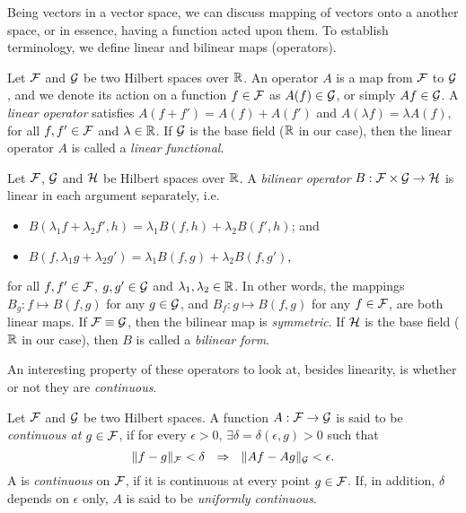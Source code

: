 Being vectors in a vector space, we can discuss mapping of vectors onto a another space, or in essence, having a function acted upon them.
To establish terminology, we define linear and bilinear maps (operators).

\begin{definition}
  Let ${\mathcal F}$ and ${\mathcal G}$ be two Hilbert spaces over $\mathbb{R}$.
  An operator $A$ is a map from ${\mathcal F}$ to ${\mathcal G}$, and we denote its action on a function $f \in{\mathcal F}$ as $A(f) \in {\mathcal G}$, or simply $Af \in {\mathcal G}$.
  A \emph{linear operator} satisfies $A(f+f') = A(f) + A(f')$ and $A(\lambda f) = \lambda A(f)$, for all $f,f' \in{\mathcal F}$ and $\lambda\in\mathbb{R}$.
  If ${\mathcal G}$ is the base field ($\mathbb{R}$ in our case), then the linear operator $A$ is called a \emph{linear functional}.
\end{definition}

\begin{definition}
  Let ${\mathcal F}$, ${\mathcal G}$ and ${\mathcal H}$ be Hilbert spaces over $\mathbb{R}$.
  A \emph{bilinear operator} $B:{\mathcal F}\times{\mathcal G}\to{\mathcal H}$ is linear in each argument separately, i.e.
  \begin{itemize}
    \item $B(\lambda_1 f +\lambda_2 f', h) = \lambda_1 B(f,h) + \lambda_2 B(f',h)$; and
    \item $B(f, \lambda_1 g +\lambda_2 g') = \lambda_1 B(f,g) + \lambda_2 B(f,g')$,
  \end{itemize} 
  for all $f,f' \in {\mathcal F}$, $g,g' \in {\mathcal G}$ and $\lambda_1,\lambda_2\in\mathbb{R}$.
  In other words, the mappings $B_g: f \mapsto B(f,g)$ for any $g\in{\mathcal G}$, and $B_f: g \mapsto B(f,g)$ for any $f\in{\mathcal F}$, are both linear maps.
  If ${\mathcal F}\equiv{\mathcal G}$, then the bilinear map is \emph{symmetric}.
  If ${\mathcal H}$ is the base field ($\mathbb{R}$ in our case), then $B$ is called a \emph{bilinear form}.
\end{definition}

\vspace{-0.6em}
An interesting property of these operators to look at, besides linearity, is whether or not they are \emph{continuous}.

\begin{definition}[Continuity]\label{def:continuity}
  Let ${\mathcal F}$ and ${\mathcal G}$ be two Hilbert spaces.
  A function $A:{\mathcal F}\to{\mathcal G}$ is said to be \emph{continuous at $g\in{\mathcal F}$}, if for every $\epsilon>0$, $\exists \delta=\delta(\epsilon,g)>0$ such that
  \[
    \norm{f-g}_\cF < \delta \ \ \Rightarrow \ \ \norm{Af - Ag}_\cG < \epsilon.
  \]
  A is \emph{continuous} on ${\mathcal F}$, if it is continuous at every point $g \in{\mathcal F}$.
  If, in addition, $\delta$ depends on $\epsilon$ only, $A$ is said to be \emph{uniformly continuous}.
\end{definition}

